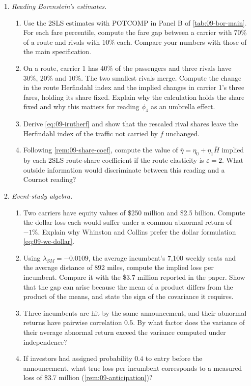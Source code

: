 \begin{enumerate}[label=\arabic*., leftmargin=*, itemsep=6pt]
\item \emph{Reading Borenstein's estimates.}
\begin{enumerate}[label=(\alph*)]
\item Use the 2SLS estimates with POTCOMP in Panel B of \cref{tab:09-bor-main}. For each fare percentile,
compute the fare gap between a carrier with 70\% of a route and rivals with 10\% each. Compare your numbers
with those of the main specification.
\item On a route, carrier 1 has 40\% of the passengers and three rivals have 30\%, 20\% and 10\%. The two
smallest rivals merge. Compute the change in the route Herfindahl index and the implied changes in carrier
1's three fares, holding its share fixed. Explain why the calculation holds the share fixed and why this
matters for reading $\phi_4$ as an umbrella effect.
\item Derive \eqref{eq:09-irutherf} and show that the rescaled rival shares leave the Herfindahl index of
the traffic not carried by $f$ unchanged.
\item Following \cref{rem:09-share-coef}, compute the value of $\bar\eta=\eta_0+\eta_1\bar H$ implied by
each 2SLS route-share coefficient if the route elasticity is $\varepsilon=2$. What outside information would discriminate between
this reading and a Cournot reading?
\end{enumerate}

\item \emph{Event-study algebra.}
\begin{enumerate}[label=(\alph*)]
\item Two carriers have equity values of \$250 million and \$2.5 billion. Compute the dollar loss each would
suffer under a common abnormal return of $-1\%$. Explain why Whinston and Collins prefer the dollar
formulation \eqref{eq:09-wc-dollar}.
\item Using $\lambda_{SM}=-0.0109$, the average incumbent's 7,100 weekly seats and the average distance of
892 miles, compute the implied loss per incumbent. Compare it with the \$3.7 million reported in the paper.
Show that the gap can arise because the mean of a product differs from the product of the means, and state
the sign of the covariance it requires.
\item Three incumbents are hit by the same announcement, and their abnormal returns have pairwise
correlation $0.5$. By what factor does the variance of their average abnormal return exceed the variance
computed under independence?
\item If investors had assigned probability $0.4$ to entry before the announcement, what true loss per
incumbent corresponds to a measured loss of \$3.7 million (\cref{rem:09-anticipation})?
\end{enumerate}


\end{enumerate}
